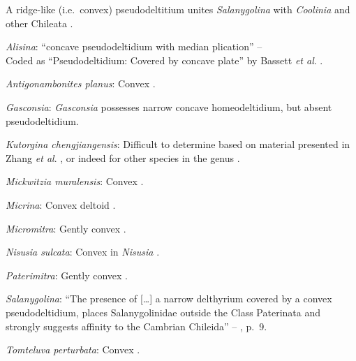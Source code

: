 \documentclass[openany]{book}
\theoremstyle{definition}
\theoremstyle{definition}
\theoremstyle{definition}
\theoremstyle{remark}
\begin{document}
A ridge-like (i.e.~convex) pseudodeltitium unites \emph{Salanygolina}
with \emph{Coolinia} and other Chileata
\citep[p.~6]{Holmer2009Theenigmatic}.

\hypertarget{Alisina-coding-112}{}
\emph{Alisina}: ``concave pseudodeltidium with median plication'' --
\citet{Williams2000LinguliformeaCraniiformea}\\
Coded as ``Pseudodeltidium: Covered by concave plate'' by Bassett
\emph{et al}. \citeyearpar{Bassett2001Functionalmorphology}.

\hypertarget{Antigonambonites_planus-coding-112}{}
\emph{Antigonambonites planus}: Convex \citep[fig.
508]{Williams2000LinguliformeaCraniiformea}.

\hypertarget{Gasconsia-coding-112}{}
\emph{Gasconsia}: \emph{Gasconsia} possesses narrow concave
homeodeltidium, but absent pseudodeltidium.

\hypertarget{Kutorgina_chengjiangensis-coding-112}{}
\emph{Kutorgina chengjiangensis}: Difficult to determine based on
material presented in Zhang \emph{et al}.
\citeyearpar{Zhang2007Rhynchonelliformeanbrachiopods}, or indeed for
other species in the genus
\citep[e.g.][]{Williams2000LinguliformeaCraniiformea, Skovsted2005EarlyCambrian, Holmer2018Theattachment}.

\hypertarget{Mickwitzia_muralensis-coding-112}{}
\emph{Mickwitzia muralensis}: Convex \citep[see][fig.
4B]{Balthasar2004Shellstructure}.

\hypertarget{Micrina-coding-112}{}
\emph{Micrina}: Convex deltoid \citep{Holmer2008TheEarly}.

\hypertarget{Micromitra-coding-112}{}
\emph{Micromitra}: Gently convex \citep[see][fig.
83.3]{Williams2000LinguliformeaCraniiformea}.

\hypertarget{Nisusia_sulcata-coding-112}{}
\emph{Nisusia sulcata}: Convex in \emph{Nisusia} \citep[see][fig.
8.4]{Rowell1985Theevolutionary}.

\hypertarget{Paterimitra-coding-112}{}
\emph{Paterimitra}: Gently convex \citep[see][fig.
83.1]{Williams2000LinguliformeaCraniiformea}.

\hypertarget{Salanygolina-coding-112}{}
\emph{Salanygolina}: ``The presence of {[}\ldots{}{]} a narrow
delthyrium covered by a convex pseudodeltidium, places Salanygolinidae
outside the Class Paterinata and strongly suggests affinity to the
Cambrian Chileida'' -- \citet{Holmer2009Theenigmatic}, p.~9.

\hypertarget{Tomteluva_perturbata-coding-112}{}
\emph{Tomteluva perturbata}: Convex \citep{Streng2016Anew}.
\end{document}
